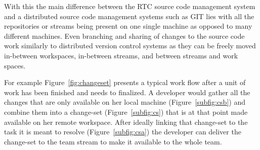 With this the main difference between the RTC source code management system and a distributed source code management systems such as GIT lies with all the repositories or streams being present on one single machine as opposed to many different machines.
Even branching and sharing of changes to the source code work similarly to distributed version control systems as they can be freely moved in-between workspaces, in-between streams, and between streams and work spaces.

For example Figure~\ref{fig:changeset} presents a typical work flow after a unit of work has been finished and needs to finalized.
A developer would gather all the changes that are only available on her local machine (Figure~\ref{subfig:csb}) and combine them into a change-set (Figure~\ref{subfig:cs}) that is at that point made available on her remote workspace.
After ideally linking that change-set to the task it is meant to resolve (Figure~\ref{subfig:csa}) the developer can deliver the change-set to the team stream to make it available to the whole team.

